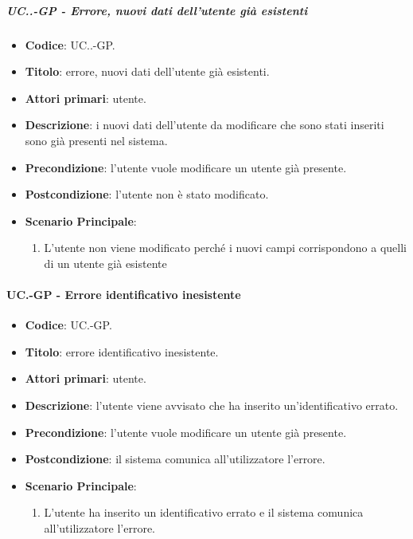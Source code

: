 		\subparagraph{UC\theuccount.\thesubuccount.\thesubsubuccount-GP - Errore, nuovi dati dell'utente già esistenti}
		
		\begin{itemize}
			\item \textbf{Codice}: UC\theuccount.\thesubuccount.\thesubsubuccount-GP.
			\item \textbf{Titolo}: errore, nuovi dati dell'utente già esistenti.
			\item \textbf{Attori primari}: utente.
			\item \textbf{Descrizione}: i nuovi dati dell'utente da modificare che sono stati inseriti sono già presenti nel sistema.
			\item \textbf{Precondizione}: l'utente vuole modificare un utente già presente.
			\item \textbf{Postcondizione}: l'utente non è stato modificato.
			\item \textbf{Scenario Principale}:
			\begin{enumerate}
				\item L'utente non viene modificato perché i nuovi campi corrispondono a quelli di un utente già esistente
			\end{enumerate}
		\end{itemize}
	\paragraph{UC\theuccount.\thesubuccount-GP - Errore identificativo inesistente}
		
		\begin{itemize}
			\item \textbf{Codice}: UC\theuccount.\thesubuccount-GP.
			\item \textbf{Titolo}: errore identificativo inesistente.
			\item \textbf{Attori primari}: utente.
			\item \textbf{Descrizione}:  l’utente viene avvisato che ha inserito un'identificativo errato.
			\item \textbf{Precondizione}: l'utente vuole modificare un utente già presente.
			\item \textbf{Postcondizione}: il sistema comunica all’utilizzatore l’errore.
			\item \textbf{Scenario Principale}:
			\begin{enumerate}
				\item L'utente ha inserito un identificativo errato e il sistema comunica all’utilizzatore l’errore.
			\end{enumerate}
		\end{itemize}